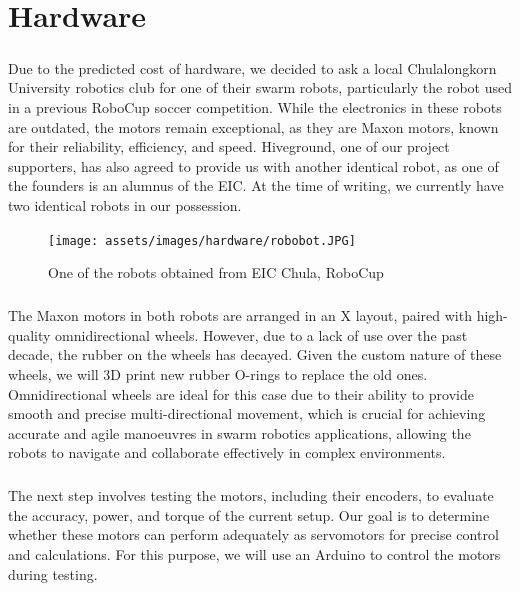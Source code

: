 \chapter{Hardware}

\paragraph*{}
Due to the predicted cost of hardware, we decided to ask a local Chulalongkorn University robotics club for one of their swarm robots, particularly the robot used in a previous RoboCup soccer competition. While the electronics in these robots are outdated, the motors remain exceptional, as they are Maxon motors, known for their reliability, efficiency, and speed. Hiveground, one of our project supporters, has also agreed to provide us with another identical robot, as one of the founders is an alumnus of the EIC. At the time of writing, we currently have two identical robots in our possession.

\begin{figure}
    \centering                 
    \texttt{[image: assets/images/hardware/robobot.JPG]}
    \caption{One of the robots obtained from EIC Chula, RoboCup}
    \label{fig:robobot}
\end{figure}

\paragraph*{}
The Maxon motors in both robots are arranged in an X layout, paired with high-quality omnidirectional wheels. However, due to a lack of use over the past decade, the rubber on the wheels has decayed. Given the custom nature of these wheels, we will 3D print new rubber O-rings to replace the old ones. Omnidirectional wheels are ideal for this case due to their ability to provide smooth and precise multi-directional movement, which is crucial for achieving accurate and agile manoeuvres in swarm robotics applications, allowing the robots to navigate and collaborate effectively in complex environments.
\paragraph*{}
The next step involves testing the motors, including their encoders, to evaluate the accuracy, power, and torque of the current setup. Our goal is to determine whether these motors can perform adequately as servomotors for precise control and calculations. For this purpose, we will use an Arduino to control the motors during testing.
